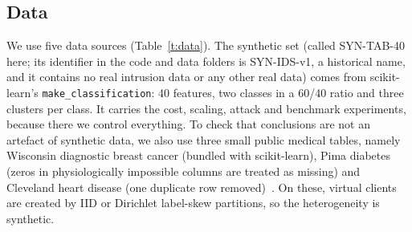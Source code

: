 \documentclass[conference]{IEEEtran}
\begin{document}
\subsection{Data}
We use five data sources (Table~\ref{t:data}). The synthetic set (called SYN-TAB-40 here; its identifier in the code and data folders is SYN-IDS-v1, a historical name, and it contains no real intrusion data or any other real data) comes from scikit-learn's \texttt{make\_classification}: 40 features, two classes in a 60/40 ratio and three clusters per class. It carries the cost, scaling, attack and benchmark experiments, because there we control everything. To check that conclusions are not an artefact of synthetic data, we also use three small public medical tables, namely Wisconsin diagnostic breast cancer (bundled with scikit-learn), Pima diabetes (zeros in physiologically impossible columns are treated as missing) and Cleveland heart disease (one duplicate row removed)~\cite{uci_wdbc,uci_heart,pima_nidd,smith1988}. On these, virtual clients are created by IID or Dirichlet label-skew partitions, so the heterogeneity is synthetic.
\end{document}
